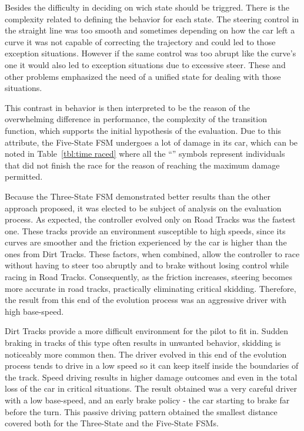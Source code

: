 	Besides the difficulty in deciding on wich state should be triggred. There is the complexity related to defining the behavior for each state. The steering control in the straight line was too smooth and sometimes depending on how the car left a curve it was not capable of correcting the trajectory and could led to those exception situations. However if the same control was too abrupt like the curve's one it would also led to exception situations due to excessive steer. These and other problems emphasized the need of a unified state for dealing with those situations.
	
	This contrast in behavior is then interpreted to be the reason of the overwhelming difference in performance, the complexity of the transition function, which supports the initial hypothesis of the evaluation. Due to this attribute, the Five-State FSM undergoes a lot of damage in its car, which can be noted in Table~\ref{tbl:time raced} where all the ``\textdagger'' symbols represent individuals that did not finish the race for the reason of reaching the maximum damage permitted.
	
	Because the Three-State FSM demonstrated better results than the other approach proposed, it was elected to be subject of analysis on the evaluation process. As expected, the controller evolved only on Road Tracks was the fastest one. These tracks provide an environment susceptible to high speeds, since its curves are smoother and the friction experienced by the car is higher than the ones from Dirt Tracks. These factors, when combined, allow the controller to race without having to steer too abruptly and to brake without losing control while racing in Road Tracks. Consequently, as the friction increases, steering becomes more accurate in road tracks, practically eliminating critical skidding. Therefore, the result from this end of the evolution process was an aggressive driver with high base-speed.
	
	Dirt Tracks provide a more difficult environment for the pilot to fit in. Sudden braking in tracks of this type often results in unwanted behavior, skidding is noticeably more common then. The driver evolved in this end of the evolution process tends to drive in a low speed so it can keep itself inside the boundaries of the track. Speed driving results in higher damage outcomes and even in the total loss of the car in critical situations. The result obtained was a very careful driver with a low base-speed, and an early brake policy - the car starting to brake far before the turn. This passive driving pattern obtained the smallest distance covered both for the Three-State and the Five-State FSMs.
	
